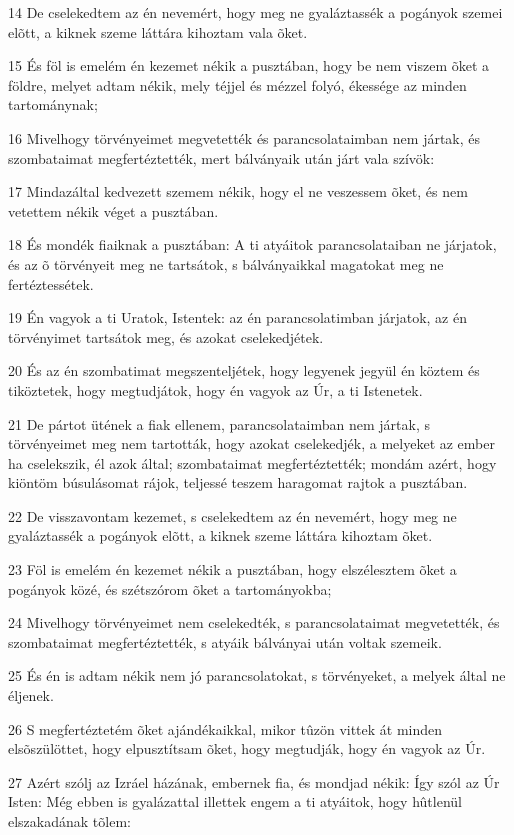 \par 14 De cselekedtem az én nevemért, hogy meg ne gyaláztassék a pogányok szemei elõtt, a kiknek szeme láttára kihoztam vala õket.
\par 15 És föl is emelém én kezemet nékik a pusztában, hogy be nem viszem õket a földre, melyet adtam nékik, mely téjjel és mézzel folyó, ékessége az minden tartománynak;
\par 16 Mivelhogy törvényeimet megvetették és parancsolataimban nem jártak, és szombataimat megfertéztették, mert bálványaik után járt vala szívök:
\par 17 Mindazáltal kedvezett szemem nékik, hogy el ne veszessem õket, és nem vetettem nékik véget a pusztában.
\par 18 És mondék fiaiknak a pusztában: A ti atyáitok parancsolataiban ne járjatok, és az õ törvényeit meg ne tartsátok, s bálványaikkal magatokat meg ne fertéztessétek.
\par 19 Én vagyok a ti Uratok, Istentek: az én parancsolatimban járjatok, az én törvényimet tartsátok meg, és azokat cselekedjétek.
\par 20 És az én szombatimat megszenteljétek, hogy legyenek jegyül én köztem és tiköztetek, hogy megtudjátok, hogy én vagyok az Úr, a ti Istenetek.
\par 21 De pártot ütének a fiak ellenem, parancsolataimban nem jártak, s törvényeimet meg nem tartották, hogy azokat cselekedjék, a melyeket az ember ha cselekszik, él azok által; szombataimat megfertéztették; mondám azért, hogy kiöntöm búsulásomat rájok, teljessé teszem haragomat rajtok a pusztában.
\par 22 De visszavontam kezemet, s cselekedtem az én nevemért, hogy meg ne gyaláztassék a pogányok elõtt, a kiknek szeme láttára kihoztam õket.
\par 23 Föl is emelém én kezemet nékik a pusztában, hogy elszélesztem õket a pogányok közé, és szétszórom õket a tartományokba;
\par 24 Mivelhogy törvényeimet nem cselekedték, s parancsolataimat megvetették, és szombataimat megfertéztették, s atyáik bálványai után voltak szemeik.
\par 25 És én is adtam nékik nem jó parancsolatokat, s törvényeket, a melyek által ne éljenek.
\par 26 S megfertéztetém õket ajándékaikkal, mikor tûzön vittek át minden elsõszülöttet,  hogy elpusztítsam õket, hogy megtudják, hogy én vagyok az Úr.
\par 27 Azért szólj az Izráel házának, embernek fia, és mondjad nékik: Így szól az Úr Isten: Még ebben is gyalázattal illettek engem a ti atyáitok, hogy hûtlenül elszakadának tõlem:
